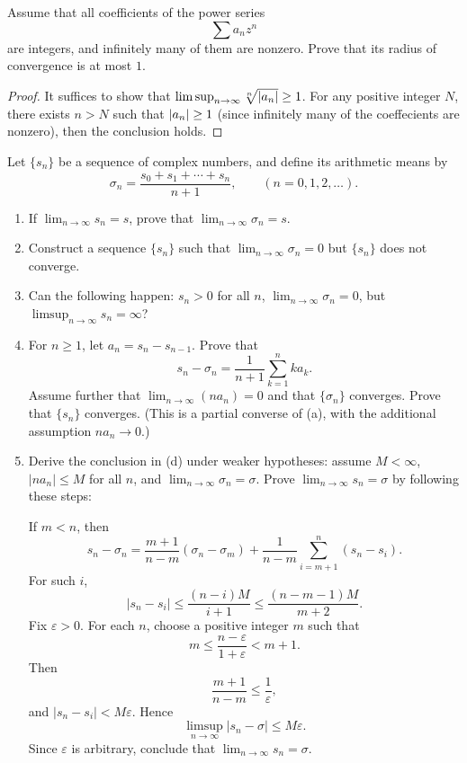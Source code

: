 \documentclass{article}
\begin{document}
\begin{problem}[3-10]
Assume that all coefficients of the power series
\[
\sum a_n z^n
\]
are integers, and infinitely many of them are nonzero. Prove that its radius of convergence is at most $1$.
\end{problem}

\begin{proof}
  It suffices to show that \( \limsup_{n\to\infty}\sqrt[n]{\left|a_n\right|}\ge 1 \). For any positive integer \( N \), there exists \( n>N \) such that \( \left|a_n\right|\ge 1 \) (since infinitely many of the coeffecients are nonzero), then the conclusion holds.
\end{proof}



\begin{problem}[3-14]
Let $\{s_n\}$ be a sequence of complex numbers, and define its arithmetic means by
\[
\sigma_n = \frac{s_0 + s_1 + \cdots + s_n}{n+1}, \qquad (n=0,1,2,\ldots).
\]
\begin{enumerate}
	\item[(a)] If $\lim_{n\to\infty} s_n = s$, prove that $\lim_{n\to\infty} \sigma_n = s$.
	\item[(b)] Construct a sequence $\{s_n\}$ such that $\lim_{n\to\infty} \sigma_n = 0$ but $\{s_n\}$ does not converge.
	\item[(c)] Can the following happen: $s_n>0$ for all $n$, $\lim_{n\to\infty} \sigma_n=0$, but $\limsup_{n\to\infty} s_n = \infty$?
	\item[(d)] For $n\ge 1$, let $a_n = s_n - s_{n-1}$. Prove that
	\[
	s_n - \sigma_n = \frac{1}{n+1}\sum_{k=1}^{n} k a_k.
	\]
	Assume further that $\lim_{n\to\infty}(n a_n)=0$ and that $\{\sigma_n\}$ converges. Prove that $\{s_n\}$ converges. (This is a partial converse of (a), with the additional assumption $n a_n\to 0$.)
	\item[(e)] Derive the conclusion in (d) under weaker hypotheses: assume $M<\infty$, $|n a_n|\le M$ for all $n$, and $\lim_{n\to\infty}\sigma_n=\sigma$. Prove $\lim_{n\to\infty}s_n=\sigma$ by following these steps:

	If $m<n$, then
	\[
	s_n-\sigma_n = \frac{m+1}{n-m}(\sigma_n-\sigma_m) + \frac{1}{n-m}\sum_{i=m+1}^{n}(s_n-s_i).
	\]
	For such $i$,
	\[
	|s_n-s_i| \le \frac{(n-i)M}{i+1} \le \frac{(n-m-1)M}{m+2}.
	\]
	Fix $\varepsilon>0$. For each $n$, choose a positive integer $m$ such that
	\[
	m \le \frac{n-\varepsilon}{1+\varepsilon} < m+1.
	\]
	Then
	\[
	\frac{m+1}{n-m} \le \frac{1}{\varepsilon},
	\]
	and $|s_n-s_i|<M\varepsilon$. Hence
	\[
	\limsup_{n\to\infty}|s_n-\sigma| \le M\varepsilon.
	\]
	Since $\varepsilon$ is arbitrary, conclude that $\lim_{n\to\infty}s_n=\sigma$.
\end{enumerate}
\end{problem}
\end{document}

